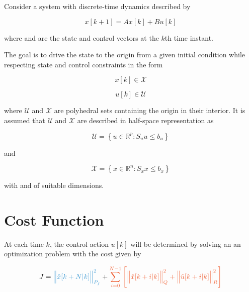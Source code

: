 Consider a system with discrete-time dynamics described by

    \begin{equation}
        x[k + 1] = A x[k] + B u[k]
        \label{cap3-dynamic-equation}
    \end{equation}

\noindent
where  and  are 
the state and control vectors at the $k$th time instant.

The goal is to drive the state  to the origin from a given initial condition while respecting
state and control constraints in the form

\begin{equation}
    \label{cap3_x_in_X}
    x[k] \in \mathcal{X}
\end{equation}
    
\begin{equation}
    \label{cap3_u_in_U}
    u[k] \in \mathcal{U}
\end{equation}

\noindent
where $\mathcal{U}$ and $\mathcal{X}$ are polyhedral sets containing the origin in their interior.
It is assumed that $\mathcal{U}$ and $\mathcal{X}$ are described in half-space representation as


\begin{equation}
    \mathcal{U} = \left\{
        u \in \mathbb{R}^p : S_u u \leq b_u	
    \right\}
\end{equation}

\noindent
and

\begin{equation}
    \label{cap3_eq_Sx_bx}
    \mathcal{X} = \left\{
        x \in \mathbb{R}^n : S_x x \leq b_x
    \right\}
\end{equation}

\noindent
with  and  of suitable dimensions.

\section{Cost Function}


At each time $k$, the control action $u[k]$ will be determined by solving an 
an optimization problem with the cost given by


\begin{equation}
    J = \blue{\norma{\hat{x}[k + N | k]}{P_f}} + \orange{\sum^{N-1}_{i=0} \Bigg[ \norma{\hat{x}[k + i | k]}{Q} + \norma{\hat{u}[k + i | k]}{R} \Bigg]}
\end{equation}

